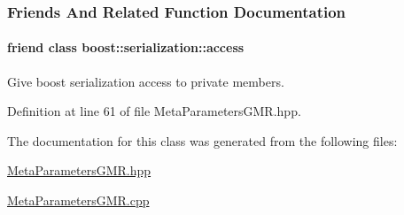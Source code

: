 \subsubsection{Friends And Related Function Documentation}
\hypertarget{classDmpBbo_1_1MetaParametersGMR_ac98d07dd8f7b70e16ccb9a01abf56b9c}{
\paragraph[{boost\+::serialization\+::access}]{\setlength{\rightskip}{0pt plus 5cm}friend class boost\+::serialization\+::access\hspace{0.3cm}{\ttfamily [friend]}}}\label{classDmpBbo_1_1MetaParametersGMR_ac98d07dd8f7b70e16ccb9a01abf56b9c}


Give boost serialization access to private members. 



Definition at line 61 of file Meta\+Parameters\+G\+M\+R.\+hpp.



The documentation for this class was generated from the following files\+:\begin{DoxyCompactItemize}
\item 
\hyperlink{MetaParametersGMR_8hpp}{Meta\+Parameters\+G\+M\+R.\+hpp}\item 
\hyperlink{MetaParametersGMR_8cpp}{Meta\+Parameters\+G\+M\+R.\+cpp}\end{DoxyCompactItemize}
